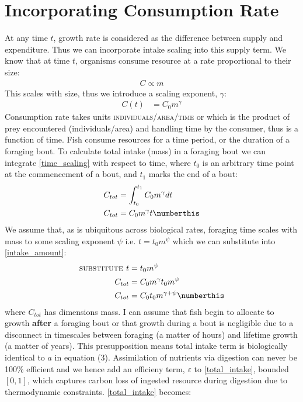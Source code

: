 \section{Incorporating Consumption Rate}
At any time $t$, growth rate is considered as the difference between supply and expenditure. Thus we can incorporate intake scaling into this supply term.
We know that at time $t$, organisms consume resource at a rate proportional to their size:
\begin{align*}
    C \propto m
\end{align*}
This scales with size, thus we introduce a scaling exponent, $\gamma$:
\begin{align}
    C(t) &= C_{0}m^{\gamma} \label{time_scaling}
\end{align}
Consumption rate takes units \textsc{individuals/area/time} or which is the product of prey encountered (individuals/area) and handling time by the consumer, thus is a function of time. Fish consume resources for a time period, or the duration of a foraging bout. To calculate total intake (mass) in a foraging bout we can integrate \cref{time_scaling} with respect to time, where $t_0$ is an arbitrary time point at the commencement of a bout, and $t_1$ marks the end of a bout:
\begin{align*}
    C_{tot} &= \int_{t_{0}}^{t_{1}}C_{0}m^{\gamma}dt \\
    C_{tot} &= C_{0}m^{\gamma}t \numberthis \label{intake_amount}
\end{align*}
We assume that, as is ubiquitous across biological rates, foraging time scales with mass to some scaling exponent $\psi$ i.e. $t = t_{0}m^{\psi}$ which we can substitute into \cref{intake_amount}:
\begin{align*}
    \textsc{substitute } t &= t_{0}m^{\psi} \\
    C_{tot} &= C_{0}m^{\gamma}t_{0}m^{\psi} \\
    C_{tot} &= C_{0}t_{0}m^{\gamma + \psi} \numberthis \label{total_intake}
\end{align*}
where $C_{tot}$ has dimensions mass. I can assume that fish begin to allocate to growth \textbf{after} a foraging bout or that growth during a bout is negligible due to a disconnect in timescales between foraging (a matter of hours) and lifetime growth (a matter of years). This presupposition means total intake term is biologically identical to $a$ in equation (3). Assimilation of nutrients via digestion can never be 100\% efficient and we hence add an efficieny term, $\varepsilon$ to \cref{total_intake}, bounded $[0,1]$, which captures carbon loss of ingested resource during digestion due to thermodynamic constraints. \cref{total_intake} becomes:
